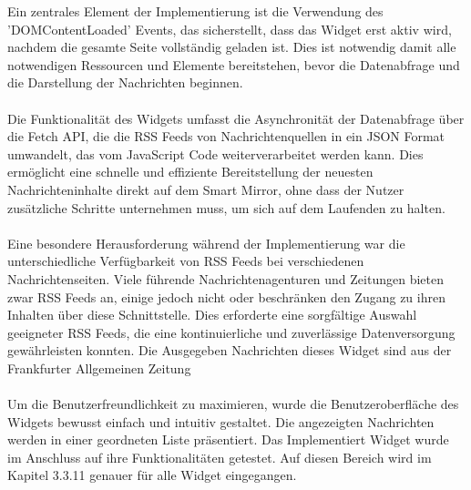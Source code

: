 \noindent
Ein zentrales Element der Implementierung ist die Verwendung des 'DOMContentLoaded' Events, das sicherstellt, dass das Widget erst aktiv wird, nachdem die gesamte Seite vollständig geladen ist. Dies ist notwendig damit alle notwendigen Ressourcen und Elemente bereitstehen, bevor die Datenabfrage und die Darstellung der Nachrichten beginnen. \\ \\
\noindent
Die Funktionalität des Widgets umfasst die Asynchronität der Datenabfrage über die Fetch API, die die RSS Feeds von Nachrichtenquellen in ein JSON Format umwandelt, das vom JavaScript Code weiterverarbeitet werden kann. Dies ermöglicht eine schnelle und effiziente Bereitstellung der neuesten Nachrichteninhalte direkt auf dem Smart Mirror, ohne dass der Nutzer zusätzliche Schritte unternehmen muss, um sich auf dem Laufenden zu halten. \\ \\
\noindent
Eine besondere Herausforderung während der Implementierung war die unterschiedliche Verfügbarkeit von RSS Feeds bei verschiedenen Nachrichtenseiten. Viele führende Nachrichtenagenturen und Zeitungen bieten zwar RSS Feeds an, einige jedoch nicht oder beschränken den Zugang zu ihren Inhalten über diese Schnittstelle. Dies erforderte eine sorgfältige Auswahl geeigneter RSS Feeds, die eine kontinuierliche und zuverlässige Datenversorgung gewährleisten konnten. Die Ausgegeben Nachrichten dieses Widget sind aus der Frankfurter Allgemeinen Zeitung \\ \\
\noindent
Um die Benutzerfreundlichkeit zu maximieren, wurde die Benutzeroberfläche des Widgets bewusst einfach und intuitiv gestaltet. Die angezeigten Nachrichten werden in einer geordneten Liste präsentiert.
\noindent
Das Implementiert Widget wurde im Anschluss auf ihre Funktionalitäten getestet. Auf diesen Bereich wird im Kapitel 3.3.11 genauer für alle Widget eingegangen.



